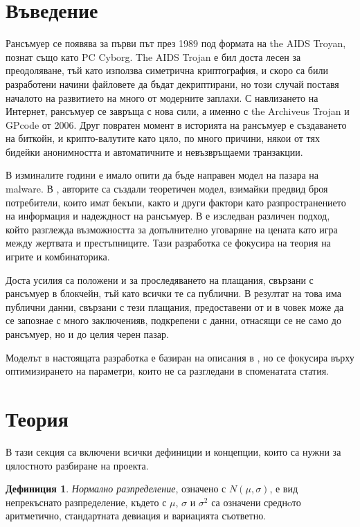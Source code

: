 \documentclass[11pt, a4paper]{article}
\theoremstyle{definition}
\newtheorem{definition}{Дефиниция}
\begin{document}
\section{Въведение}
		Рансъмуер се появява за първи път през 1989 под формата на the AIDS Troyan, познат също като PC Cyborg.  The AIDS Trojan е бил доста лесен за преодоляване, тъй като използва симетрична криптография, и скоро са били разработени начини файловете да бъдат декриптирани, но този случай поставя началото на развитието на много от модерните заплахи. С навлизането на Интернет, рансъмуер се завръща с нова сили, а именно с the Archiveus Trojan и GPcode от 2006. Друг повратен момент в историята на рансъмуер е създаването на биткойн, и крипто-валутите като цяло, по много причини, някои от тях бидейки анонимността и автоматичните и невъзвръщаеми транзакции\cite{huang2018tracking}.\par
		В изминалите години е имало опити да бъде направен модел на пазара на malware. В \cite{caulfielddynamic}, авторите са създали теоретичен модел, взимайки предвид броя потребители, които имат бекъпи, както и други фактори като разпространението на информация и надеждност на рансъмуер.           
		В \cite{cartwright2018pay} е изследван различен подход, който разглежда възможността за допълнително уговаряне на цената като игра между жертвата и престъпниците. Тази разработка се фокусира на теория на игрите и комбинаторика.\par
		Доста усилия са положени и за проследяването на плащания, свързани с рансъмуер в блокчейн, тъй като всички те са публични. В резултат на това има публични данни, свързани с тези плащания, предоставени от \cite{paquet2019ransomware} и в \cite{thomas2015framing} човек може да се запознае с много заключенияв, подкрепени с данни, отнасящи се не само до рансъмуер, но и до целия черен пазар.\par
		Моделът в настоящата разработка е базиран на описания в \cite{caulfielddynamic}, но се фокусира върху оптимизирането на параметри, които не са разгледани в споменатата статия.
\newpage
	\section{Теория}
	В тази секция са включени всички дефиниции и концепции, които са нужни за цялостното разбиране на проекта.
		\begin{definition}
			\label{def:normdist}
			\emph{Нормално разпределение}, означено  с $N(\mu, \sigma)$, е вид непрекъснато разпределение, където с $\mu$, $\sigma$ и $\sigma^{2}$ са означени среднoто аритметично, стандартната девиация и вариацията съответно.
		\end{definition}
	
\end{document}
